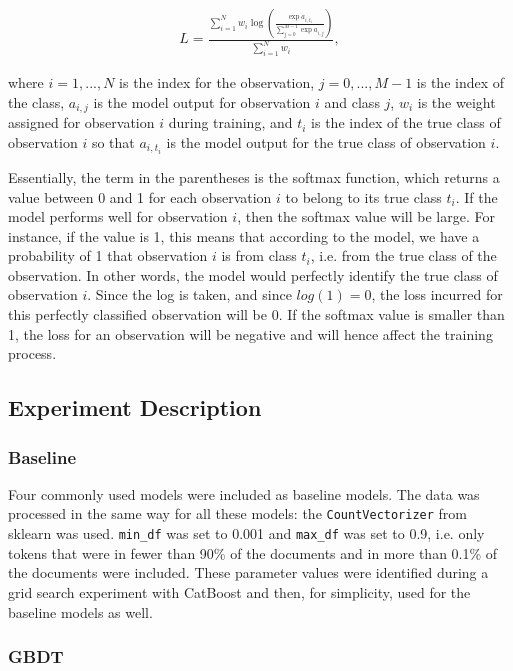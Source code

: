 \documentclass{article}
\begin{document}
	\begin{align}
	L = \frac{\sum_{i = 1}^N w_i \log \left(\frac{\exp a_{i, t_i}}{\sum_{j = 0}^{M-1} \exp a_{i, j}}\right)}{\sum_{i = 1}^N w_i}, 
	\end{align}
	
	where $i = 1, ..., N$ is the index for the observation, $j = 0, ..., M-1$ is the index of the class, $a_{i, j}$ is the model output for observation $i$ and class $j$, $w_i$ is the weight assigned for observation $i$ during training, and $t_i$ is the index of the true class of observation $i$ so that $a_{i, t_i}$ is the model output for the true class of observation $i$.
	
	Essentially, the term in the parentheses is the softmax function, which returns a value between 0 and 1 for each observation $i$ to belong to its true class $t_i$. If the model performs well for observation $i$, then the softmax value will be large. For instance, if the value is 1, this means that according to the model, we have a probability of 1 that observation $i$ is from class $t_i$, i.e. from the true class of the observation. In other words, the model would perfectly identify the true class of observation $i$. Since the log is taken, and since $log(1)=0$, the loss incurred for this perfectly classified observation will be 0. If the softmax value is smaller than 1, the loss for an observation will be negative and will hence affect the training process.
	
	\subsection{Experiment Description}
	
	\subsubsection{Baseline}
	
	Four commonly used models were included as baseline models. The data was processed in the same way for all these models: the \lstinline{CountVectorizer} from sklearn was used. \lstinline{min_df} was set to 0.001 and \lstinline{max_df} was set to 0.9, i.e. only tokens that were in fewer than 90\% of the documents and in more than 0.1\% of the documents were included. These parameter values were identified during a grid search experiment with CatBoost and then, for simplicity, used for the baseline models as well.
	
	\subsubsection{GBDT}
	
\end{document}

